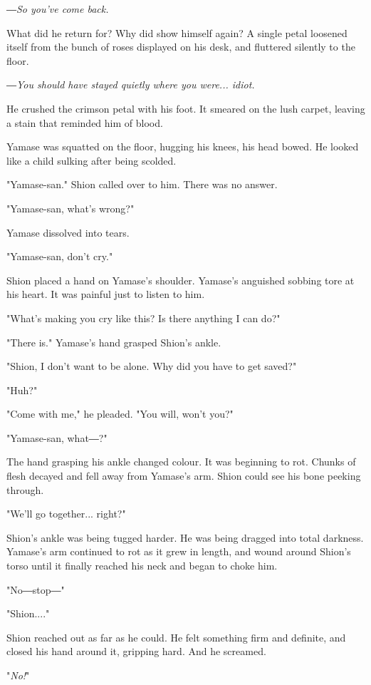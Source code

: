 \emph{―So you've come back.}

What did he return for? Why did show himself again? A single petal
loosened itself from the bunch of roses displayed on his desk, and
fluttered silently to the floor.

\emph{―You should have stayed quietly where you were... idiot.}

He crushed the crimson petal with his foot. It smeared on the lush
carpet, leaving a stain that reminded him of blood.

\mybreak

Yamase was squatted on the floor, hugging his knees, his head bowed. He
looked like a child sulking after being scolded.

"Yamase-san." Shion called over to him. There was no answer.

"Yamase-san, what's wrong?"

Yamase dissolved into tears.

"Yamase-san, don't cry."

Shion placed a hand on Yamase's shoulder. Yamase's anguished sobbing
tore at his heart. It was painful just to listen to him.

"What's making you cry like this? Is there anything I can do?"

"There is." Yamase's hand grasped Shion's ankle.

"Shion, I don't want to be alone. Why did you have to get saved?"

"Huh?"

"Come with me," he pleaded. "You will, won't you?"

"Yamase-san, what―?"

The hand grasping his ankle changed colour. It was beginning to rot.
Chunks of flesh decayed and fell away from Yamase's arm. Shion could see
his bone peeking through.

"We'll go together... right?"

Shion's ankle was being tugged harder. He was being dragged into total
darkness. Yamase's arm continued to rot as it grew in length, and wound
around Shion's torso until it finally reached his neck and began to
choke him.

"No―stop―"

"Shion...."

Shion reached out as far as he could. He felt something firm and
definite, and closed his hand around it, gripping hard. And he screamed.

"\emph{No!}"


